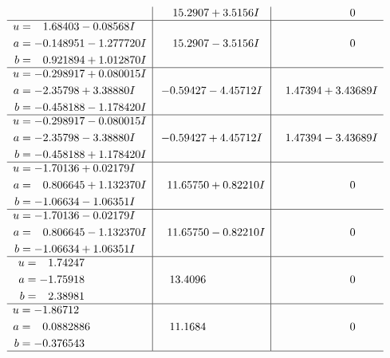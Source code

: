 \documentclass[1p]{elsarticle_modified}
\theoremstyle{definition}
\begin{document}
$$\begin{array}{c|c|c}
 & \phantom{-}15.2907 + 3.5156 I & \phantom{-0.000000 } 0 \\ \hline\begin{aligned}
u &= \phantom{-}1.68403 - 0.08568 I \\
a &= -0.148951 - 1.277720 I \\
b &= \phantom{-}0.921894 + 1.012870 I\end{aligned}
 & \phantom{-}15.2907 - 3.5156 I & \phantom{-0.000000 } 0 \\ \hline\begin{aligned}
u &= -0.298917 + 0.080015 I \\
a &= -2.35798 + 3.38880 I \\
b &= -0.458188 - 1.178420 I\end{aligned}
 & -0.59427 - 4.45712 I & \phantom{-}1.47394 + 3.43689 I \\ \hline\begin{aligned}
u &= -0.298917 - 0.080015 I \\
a &= -2.35798 - 3.38880 I \\
b &= -0.458188 + 1.178420 I\end{aligned}
 & -0.59427 + 4.45712 I & \phantom{-}1.47394 - 3.43689 I \\ \hline\begin{aligned}
u &= -1.70136 + 0.02179 I \\
a &= \phantom{-}0.806645 + 1.132370 I \\
b &= -1.06634 - 1.06351 I\end{aligned}
 & \phantom{-}11.65750 + 0.82210 I & \phantom{-0.000000 } 0 \\ \hline\begin{aligned}
u &= -1.70136 - 0.02179 I \\
a &= \phantom{-}0.806645 - 1.132370 I \\
b &= -1.06634 + 1.06351 I\end{aligned}
 & \phantom{-}11.65750 - 0.82210 I & \phantom{-0.000000 } 0 \\ \hline\begin{aligned}
u &= \phantom{-}1.74247\phantom{ +0.000000I} \\
a &= -1.75918\phantom{ +0.000000I} \\
b &= \phantom{-}2.38981\phantom{ +0.000000I}\end{aligned}
 & \phantom{-}13.4096\phantom{ +0.000000I} & \phantom{-0.000000 } 0 \\ \hline\begin{aligned}
u &= -1.86712\phantom{ +0.000000I} \\
a &= \phantom{-}0.0882886\phantom{ +0.000000I} \\
b &= -0.376543\phantom{ +0.000000I}\end{aligned}
 & \phantom{-}11.1684\phantom{ +0.000000I} & \phantom{-0.000000 } 0\\
 \hline 
 \end{array}$$\newpage\newpage\renewcommand{\arraystretch}{1}
\end{document}
